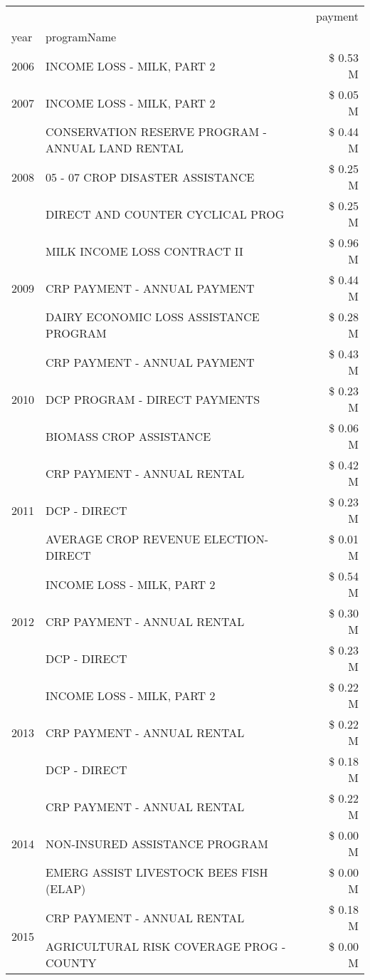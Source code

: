 \begin{tabular}{llr}
\toprule
 &  & payment \\
year & programName &  \\
\midrule
2006 & INCOME LOSS - MILK, PART 2 & \$ 0.53 M \\
\cline{1-3}
2007 & INCOME LOSS - MILK, PART 2 & \$ 0.05 M \\
\cline{1-3}
\multirow[t]{3}{*}{2008} & CONSERVATION RESERVE PROGRAM - ANNUAL LAND RENTAL & \$ 0.44 M \\
 & 05 - 07 CROP DISASTER ASSISTANCE & \$ 0.25 M \\
 & DIRECT AND COUNTER CYCLICAL PROG & \$ 0.25 M \\
\cline{1-3}
\multirow[t]{3}{*}{2009} & MILK INCOME LOSS CONTRACT II & \$ 0.96 M \\
 & CRP PAYMENT - ANNUAL PAYMENT & \$ 0.44 M \\
 & DAIRY ECONOMIC LOSS ASSISTANCE PROGRAM & \$ 0.28 M \\
\cline{1-3}
\multirow[t]{3}{*}{2010} & CRP PAYMENT - ANNUAL PAYMENT & \$ 0.43 M \\
 & DCP PROGRAM - DIRECT PAYMENTS & \$ 0.23 M \\
 & BIOMASS CROP ASSISTANCE & \$ 0.06 M \\
\cline{1-3}
\multirow[t]{3}{*}{2011} & CRP PAYMENT - ANNUAL RENTAL & \$ 0.42 M \\
 & DCP - DIRECT & \$ 0.23 M \\
 & AVERAGE CROP REVENUE ELECTION-DIRECT & \$ 0.01 M \\
\cline{1-3}
\multirow[t]{3}{*}{2012} & INCOME LOSS - MILK, PART 2 & \$ 0.54 M \\
 & CRP PAYMENT - ANNUAL RENTAL & \$ 0.30 M \\
 & DCP - DIRECT & \$ 0.23 M \\
\cline{1-3}
\multirow[t]{3}{*}{2013} & INCOME LOSS - MILK, PART 2 & \$ 0.22 M \\
 & CRP PAYMENT - ANNUAL RENTAL & \$ 0.22 M \\
 & DCP - DIRECT & \$ 0.18 M \\
\cline{1-3}
\multirow[t]{3}{*}{2014} & CRP PAYMENT - ANNUAL RENTAL & \$ 0.22 M \\
 & NON-INSURED ASSISTANCE PROGRAM & \$ 0.00 M \\
 & EMERG ASSIST LIVESTOCK BEES FISH (ELAP) & \$ 0.00 M \\
\cline{1-3}
\multirow[t]{2}{*}{2015} & CRP PAYMENT - ANNUAL RENTAL & \$ 0.18 M \\
 & AGRICULTURAL RISK COVERAGE PROG - COUNTY & \$ 0.00 M \\

\end{tabular}
